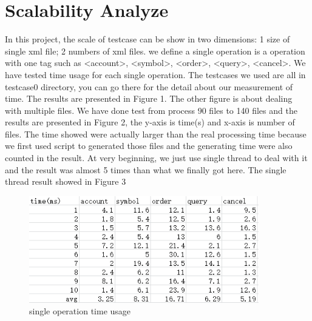 \documentclass{article}
\begin{document}
\section{Scalability Analyze}
%
In this project, the scale of testcase can be show in two dimensions: 
1 size of single xml file;
2 numbers of xml files.
we define a single operation is a operation with one tag such as <account>, <symbol>, <order>, <query>, <cancel>. We have tested time usage for each single operation. The testcases we used are all in testcase0 directory, you can go there for the detail about our measurement of time. The results are presented in Figure 1. The other figure is about dealing with multiple files. We have done test from process 90 files to 140 files and the results are presented in Figure 2, the y-axis is time(s) and x-axis is number of files. The time showed were actually larger than the real processing time because we first used script to generated those files and the generating time were also counted in the result. At very beginning, we just use single thread to deal with it and the result was almost 5 times than what we finally got here. The single thread  result showed in Figure 3\\
%
\begin{figure}[h!]
\centering
\includegraphics[width=100mm]{spt}
\caption{single operation time usage}
\label{fig:method}
\end{figure}
%
\end{document}
